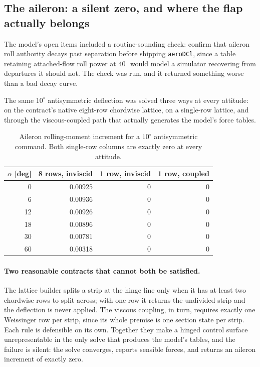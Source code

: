 \documentclass[11pt,a4paper]{article}
\newcommand{\varid}[1]{\texttt{\small #1}}
\newcommand{\dg}{^\circ}
\begin{document}


\subsection{The aileron: a silent zero, and where the flap actually
belongs}
\label{sec:aileron}

The model's open items included a routine-sounding check: confirm that
aileron roll authority decays past separation before shipping
\varid{aeroDCl}, since a table retaining attached-flow roll power at
$40\dg$ would model a simulator recovering from departures it should
not. The check was run, and it returned something worse than a bad decay
curve.

The same $10\dg$ antisymmetric deflection was solved three ways at every
attitude: on the contract's native eight-row chordwise lattice, on a
single-row lattice, and through the viscous-coupled path that actually
generates the model's force tables.

\begin{table}[htbp]
\centering
\caption{Aileron rolling-moment increment for a $10\dg$ antisymmetric
command. Both single-row columns are exactly zero at every attitude.}
\label{tab:aileron}
\begin{tabular}{@{}rrrr@{}}
\toprule
$\alpha$ [deg] & 8 rows, inviscid & 1 row, inviscid & 1 row, coupled \\
\midrule
0 & 0.00925 & 0 & 0 \\
6 & 0.00936 & 0 & 0 \\
12 & 0.00926 & 0 & 0 \\
18 & 0.00896 & 0 & 0 \\
30 & 0.00781 & 0 & 0 \\
60 & 0.00318 & 0 & 0 \\
\bottomrule
\end{tabular}
\end{table}

\paragraph{Two reasonable contracts that cannot both be satisfied.} The
lattice builder splits a strip at the hinge line only when it has at
least two chordwise rows to split across; with one row it returns the
undivided strip and the deflection is never applied. The viscous
coupling, in turn, requires exactly one Weissinger row per strip, since
its whole premise is one section state per strip. Each rule is
defensible on its own. Together they make a hinged control surface
unrepresentable in the only solve that produces the model's tables, and
the failure is silent: the solve converges, reports sensible forces, and
returns an aileron increment of exactly zero.
\end{document}
